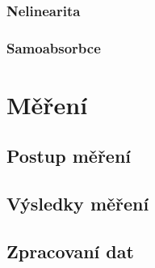 \subsubsection{Nelinearita}
\subsubsection{Samoabsorbce}
\section{Měření}
\subsection{Postup měření}%
\subsection{Výsledky měření} %
\subsection{Zpracovaní dat}
\newpage
